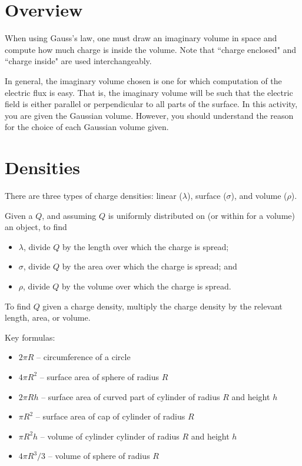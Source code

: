 \documentclass{article}
\begin{document}
\section{Overview}

When using Gauss's law, one must draw an imaginary volume in space and compute how much charge is inside the volume. Note that ``charge enclosed" and ``charge inside" are used interchangeably. 

In general, the imaginary volume chosen is one for which computation of the electric flux is easy. That is, the imaginary volume will be such that the electric field is either parallel or perpendicular to all parts of the surface. In this activity, you are given the Gaussian volume. However, you should understand the reason for the choice of each Gaussian volume given.

\section{Densities}

There are three types of charge densities: linear ($\lambda$), surface ($\sigma$), and volume ($\rho$).

Given a $Q$, and assuming $Q$ is uniformly distributed on (or within for a volume) an object, to find 

\begin{itemize}

  \item $\lambda$, divide $Q$ by the length over which the charge is spread;

  \item $\sigma$, divide $Q$ by the area over which the charge is spread; and

  \item $\rho$, divide $Q$ by the volume over which the charge is spread.

\end{itemize}

To find $Q$ given a charge density, multiply the charge density by the relevant length, area, or volume.

Key formulas:

\begin{itemize}

  \item $2\pi R$ -- circumference of a circle

  \item $4\pi R^2$ -- surface area of sphere of radius $R$

  \item $2\pi R h$ -- surface area of curved part of cylinder of radius $R$ and height $h$

  \item $\pi R^2$ -- surface area of cap of cylinder of radius $R$

  \item $\pi R^2h$ -- volume of cylinder cylinder of radius $R$ and height $h$

  \item $4\pi R^3/3$ -- volume of sphere of radius $R$

\end{itemize}
\end{document}
